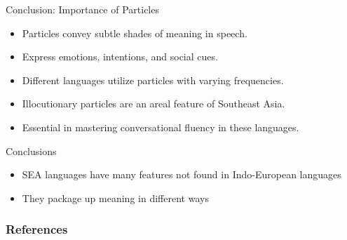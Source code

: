 \documentclass{beamer}
\begin{document}
\begin{frame}{Conclusion: Importance of Particles}
  \begin{itemize}
    \item Particles convey subtle shades of meaning in speech.
    \item Express emotions, intentions, and social cues.
    \item Different languages utilize particles with varying frequencies.
    \item Illocutionary particles are an areal feature of Southeast Asia.
    \item Essential in mastering conversational fluency in these languages.
  \end{itemize}
\end{frame}

\begin{frame}{Conclusions}
  \begin{itemize}
  \item SEA languages have many features not found in Indo-European languages
  \item They package up meaning in different ways
  \end{itemize}
\end{frame}



\begin{frame}[allowframebreaks]
        \frametitle{References}
        
        
\end{frame}
\end{document}
